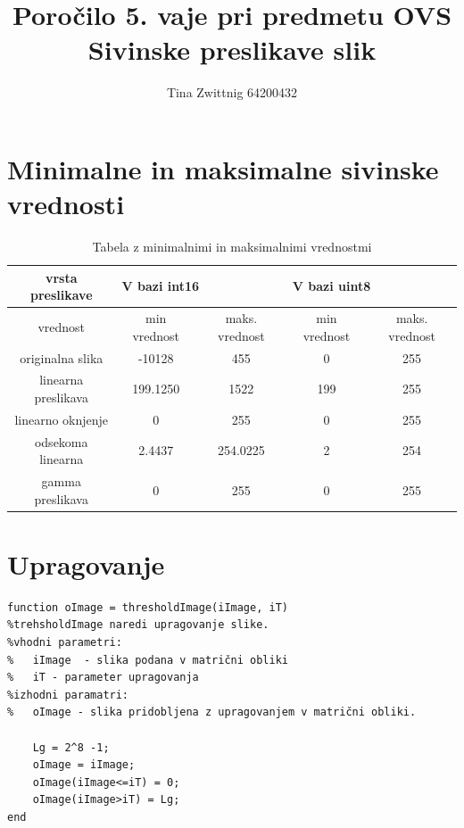 \documentclass[12pt,a4paper]{article}
\author{Tina Zwittnig 64200432}
\title{Poročilo 5. vaje pri predmetu OVS \\ Sivinske preslikave slik}
\begin{document}
\maketitle
\pagebreak
\section{Minimalne in maksimalne sivinske vrednosti}
\begin{table}[h]
\centering
        \begin{tabular}{|c|c|c|c|c|}
      \hline
      vrsta preslikave & \multicolumn{2}{|l|}{V bazi int16 } & \multicolumn{2}{|l|}{V bazi uint8 } \tabularnewline
      \hline 
      vrednost & min vrednost & maks. vrednost &min vrednost & maks. vrednost\\
      \hline 
     originalna slika & -10128 & 455 & 0 & 255\\
      \hline
      linearna preslikava &199.1250 &1522 & 199 &255 \\
      \hline
      linearno oknjenje & 0 &255 &0 &255\\
      \hline
       odsekoma linearna & 2.4437 &  254.0225 &  2 & 254 \\
      \hline
      gamma preslikava & 0 &255 &0 & 255\\
      \hline
    \end{tabular}
    \caption{Tabela z minimalnimi in maksimalnimi vrednostmi}
    \label{tab:xxx}
\end{table}
\section{Upragovanje}
\begin{verbatim}
function oImage = thresholdImage(iImage, iT)
%trehsholdImage naredi upragovanje slike.
%vhodni parametri:
%   iImage  - slika podana v matrični obliki
%   iT - parameter upragovanja
%izhodni paramatri:
%   oImage - slika pridobljena z upragovanjem v matrični obliki.

    Lg = 2^8 -1;
    oImage = iImage;
    oImage(iImage<=iT) = 0;
    oImage(iImage>iT) = Lg;
end


\end{verbatim}
\end{document}

